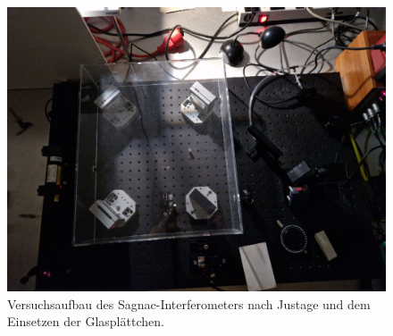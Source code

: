 \begin{figure}[H]
    \centering
    \includegraphics[scale=0.3]{images/aufbau.jpg}
    \caption{Versuchsaufbau des Sagnac-Interferometers nach Justage und dem Einsetzen der Glasplättchen.}
    \label{fig:aufbau}
\end{figure}

